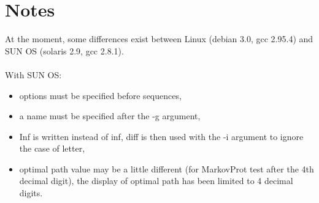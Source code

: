 \documentclass[a4paper,11pt]{article}
\begin{document}
\section{Notes}
At the moment, some differences exist between Linux (debian 3.0, gcc 2.95.4) and SUN OS (solaris 2.9, gcc 2.8.1). \\
\\
With SUN OS:
\begin{itemize}
\item options must be specified before sequences,
\item a name must be specified after the -g argument,
\item Inf is written instead of inf, diff is then used with the -i argument to ignore the case of letter,
\item optimal path value may be a little different (for MarkovProt test after the 4th decimal digit), the display of optimal path has been limited to 4 decimal digits.
\end{itemize}
\end{document}
